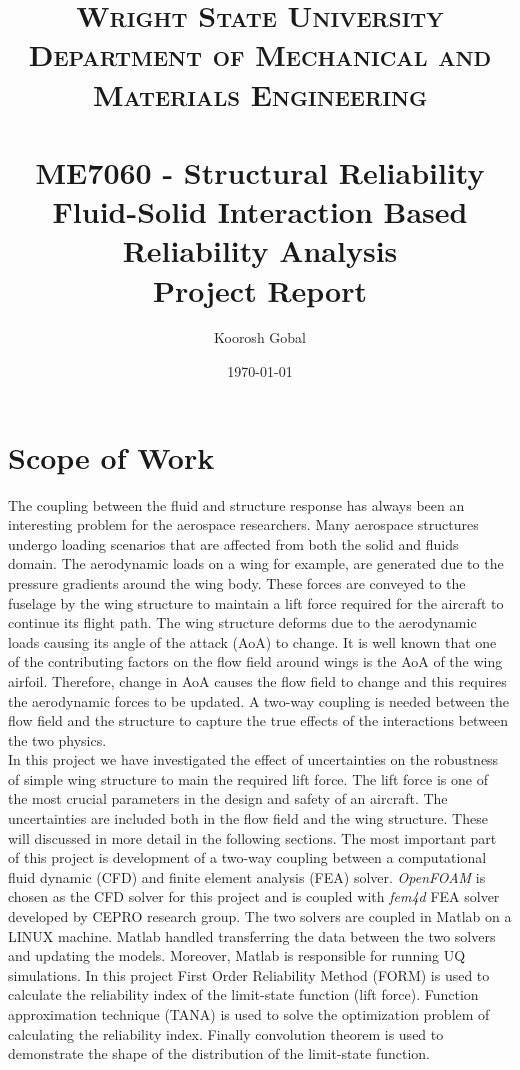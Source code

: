 \documentclass[paper=a4, fontsize=12pt]{scrartcl} %
\title{	
\normalfont \normalsize 
\textsc{Wright State University\\ Department of Mechanical and Materials Engineering} \\ [25pt] %
\horrule{0.5pt} \\[0.4cm] %
\LARGE ME7060 - Structural Reliability \\ %
\LARGE Fluid-Solid Interaction Based Reliability Analysis \\
\Large Project Report
\horrule{2pt} \\[0.5cm] %
}
\author{Koorosh Gobal} %
\date{\normalsize\today} %
\begin{document}
\maketitle %

\section{Scope of Work}
The coupling between the fluid and structure response has always been an interesting problem for the aerospace researchers. Many aerospace structures undergo loading scenarios that are affected from both the solid and fluids domain. The aerodynamic loads on a wing for example, are generated due to the pressure gradients around the wing body. These forces are conveyed to the fuselage by the wing structure to maintain a lift force required for the aircraft to continue its flight path. The wing structure deforms due to the aerodynamic loads causing its angle of the attack (AoA) to change. It is well known that one of the contributing factors on the flow field around wings is the AoA of the wing airfoil. Therefore, change in AoA causes the flow field to change and this requires the aerodynamic forces to be updated. A two-way coupling is needed between the flow field and the structure to capture the true effects of the interactions between the two physics.\\

In this project we have investigated the effect of uncertainties on the robustness of simple wing structure to main the required lift force. The lift force is one of the most crucial parameters in the design and safety of an aircraft. The uncertainties are included both in the flow field and the wing structure. These will discussed in more detail in the following sections. The most important part of this project is development of a two-way coupling between a computational fluid dynamic (CFD) and finite element analysis (FEA) solver. \emph{OpenFOAM} is chosen as the CFD solver for this project and is coupled with \emph{fem4d} FEA solver developed by CEPRO research group. The two solvers are coupled in Matlab on a LINUX machine. Matlab handled transferring the data between the two solvers and updating the models. Moreover, Matlab is responsible for running UQ simulations. In this project First Order Reliability Method (FORM) is used to calculate the reliability index of the limit-state function (lift force). Function approximation technique (TANA) is used to solve the optimization problem of calculating the reliability index. Finally convolution theorem is used to demonstrate the shape of the distribution of the limit-state function.\\
\end{document}
